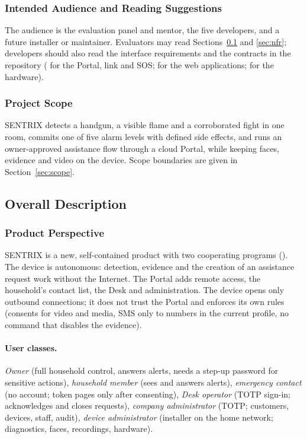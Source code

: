 \subsubsection{Intended Audience and Reading Suggestions}
The audience is the evaluation panel and mentor, the five developers, and a future installer or maintainer. Evaluators may read Sections~\ref{sec:overall} and \ref{sec:nfr}; developers should also read the interface requirements and the contracts in the repository ( for the Portal, link and SOS;  for the web applications;  for the hardware).

\subsubsection{Project Scope}
SENTRIX detects a handgun, a visible flame and a corroborated fight in one room, commits one of five alarm levels with defined side effects, and runs an owner-approved assistance flow through a cloud Portal, while keeping faces, evidence and video on the device. Scope boundaries are given in Section~\ref{sec:scope}.

\subsection{Overall Description}
\label{sec:overall}
\subsubsection{Product Perspective}
SENTRIX is a new, self-contained product with two cooperating programs (). The device is autonomous: detection, evidence and the creation of an assistance request work without the Internet. The Portal adds remote access, the household's contact list, the Desk and administration. The device opens only outbound connections; it does not trust the Portal and enforces its own rules (consents for video and media, SMS only to numbers in the current profile, no command that disables the evidence).

\paragraph{User classes.} \emph{Owner} (full household control, answers alerts, needs a step-up password for sensitive actions), \emph{household member} (sees and answers alerts), \emph{emergency contact} (no account; token pages only after consenting), \emph{Desk operator} (TOTP sign-in; acknowledges and closes requests), \emph{company administrator} (TOTP; customers, devices, staff, audit), \emph{device administrator} (installer on the home network; diagnostics, faces, recordings, hardware).

